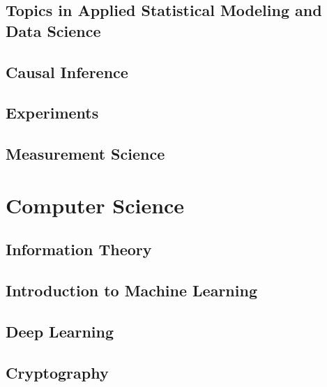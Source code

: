 \documentclass[oneside,openany]{book}
\theoremstyle{definition}
\begin{document}
\chapter{Topics in Applied Statistical Modeling and Data Science}


\chapter{Causal Inference}


\chapter{Experiments}


\chapter{Measurement Science}



\part{Computer Science}

\chapter{Information Theory}


\chapter{Introduction to Machine Learning}


\chapter{Deep Learning}


\chapter{Cryptography}

\end{document}

